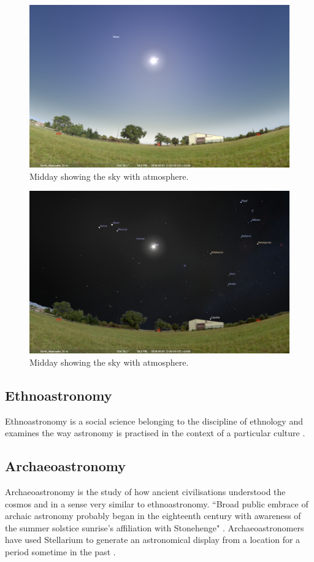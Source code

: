 \begin{figure}[ht]
	\centerline{\includegraphics[width=1\columnwidth]{with-atmosphere.png}}
	\caption{\label{fig_with-atmosphere}{Midday showing the sky with atmosphere.}}
\end{figure}

\begin{figure}[ht]
	\centerline{\includegraphics[width=1\columnwidth]{no-atmosphere.png}}
	\caption{\label{fig_no-atmosphere}{Midday showing the sky with atmosphere.}}
\end{figure}


\subsection{Ethnoastronomy}
Ethnoastronomy is a social science belonging to the discipline of ethnology and examines the way astronomy is practised in the context of a particular culture \cite{Salt2015}.

\subsection{Archaeoastronomy}
Archaeoastronomy is the study of how ancient civilisations understood the cosmos and in a sense very similar to ethnoastronomy.
``Broad public embrace of archaic astronomy probably began in the eighteenth
century with awareness of the summer solstice sunrise’s affiliation with Stonehenge" \cite[p.~263]{Krupp2015}.
Archaeoastronomers have used Stellarium to generate an astronomical display from a location for a period sometime in the past \cite{zotti2014towards}. 

